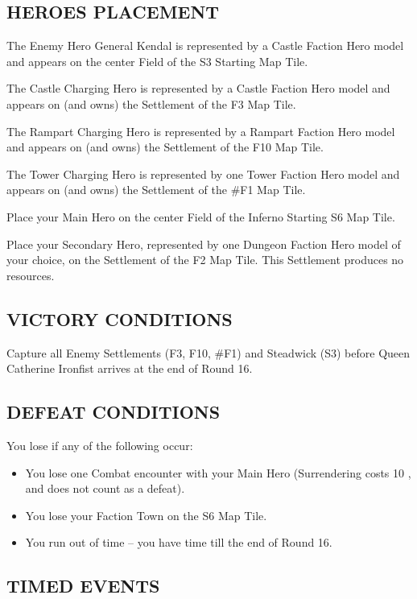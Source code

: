 \begin{multicols*}{2}
\subsection*{\MakeUppercase{Heroes Placement}}

The Enemy Hero General Kendal is represented by a Castle Faction Hero model and appears on the center Field of the S3 Starting Map Tile.

The Castle Charging Hero is represented by a Castle Faction Hero model and appears on (and owns) the Settlement of the F3 Map Tile.

The Rampart Charging Hero is represented by a Rampart Faction Hero model and appears on (and owns) the Settlement of the F10 Map Tile.

The Tower Charging Hero is represented by one Tower Faction Hero model and appears on (and owns) the Settlement of the \#F1 Map Tile.

Place your Main Hero on the center Field of the Inferno Starting S6 Map Tile.

Place your Secondary Hero, represented by one Dungeon Faction Hero model of your choice, on the Settlement of the F2 Map Tile. This Settlement produces no resources.

\subsection*{\MakeUppercase{Victory Conditions}}

Capture all Enemy Settlements (F3, F10, \#F1) and Steadwick (S3) before Queen Catherine Ironfist arrives at the end of Round 16.

\subsection*{\MakeUppercase{Defeat Conditions}}

You lose if any of the following occur:
\begin{itemize}
  \item You lose one Combat encounter with your Main Hero (Surrendering costs 10 , and does not count as a defeat).
  \item You lose your Faction Town on the S6 Map Tile.
  \item You run out of time -- you have time till the end of Round 16.
\end{itemize}

\subsection*{\MakeUppercase{Timed Events}}


\end{multicols*}
